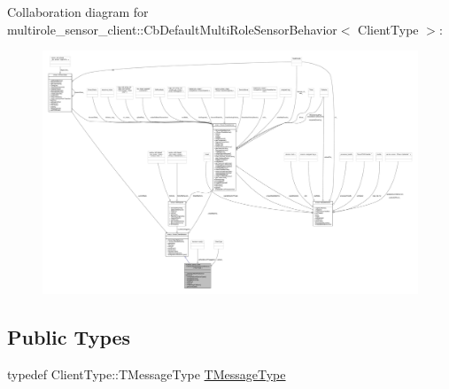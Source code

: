 Collaboration diagram for multirole\+\_\+sensor\+\_\+client\+:\+:Cb\+Default\+Multi\+Role\+Sensor\+Behavior$<$ Client\+Type $>$\+:\nopagebreak
\begin{figure}[H]
\begin{center}
\leavevmode
\includegraphics[width=350pt]{classmultirole__sensor__client_1_1CbDefaultMultiRoleSensorBehavior__coll__graph}
\end{center}
\end{figure}
\subsection*{Public Types}
\begin{DoxyCompactItemize}
\item 
typedef Client\+Type\+::\+T\+Message\+Type \hyperlink{classmultirole__sensor__client_1_1CbDefaultMultiRoleSensorBehavior_a8343b60b6962dd8a5588d8415dd33dd9}{T\+Message\+Type}
\end{DoxyCompactItemize}
